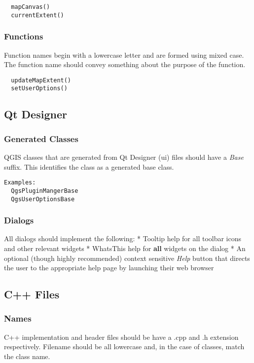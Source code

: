 \begin{verbatim}
  mapCanvas()
  currentExtent()
\end{verbatim}

\hypertarget{toc6}{}
\subsubsection{Functions}
Function names begin with a lowercase letter and are formed using mixed case.
The function name should convey something about the purpose of the function.

\begin{verbatim}
  updateMapExtent()
  setUserOptions()
\end{verbatim}

\hypertarget{toc7}{}
\subsection{Qt Designer}
\hypertarget{toc8}{}
\subsubsection{Generated Classes}
QGIS classes that are generated from Qt Designer (ui) files should have a
\textit{Base} suffix. This identifies the class as a generated base class.

\begin{verbatim}
Examples:
  QgsPluginMangerBase
  QgsUserOptionsBase
\end{verbatim}
\hypertarget{toc9}{}
\subsubsection{Dialogs}
All dialogs should implement the following:
 * Tooltip help for all toolbar icons and other relevant widgets
 * WhatsThis help for \textbf{all} widgets on the dialog
 * An optional (though highly recommended) context sensitive \textit{Help} button
   that directs the user to the appropriate help page by launching their web
   browser

\hypertarget{toc10}{}
\subsection{C++ Files}
\hypertarget{toc11}{}
\subsubsection{Names}
C++ implementation and header files should be have a .cpp and .h extension
respectively.  Filename should be all lowercase and, in the case of classes,
match the class name.

